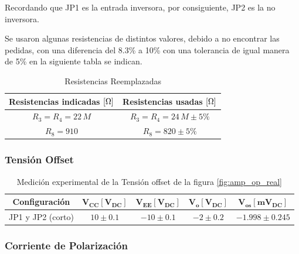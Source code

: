     Recordando que JP1 es la entrada inversora, por consiguiente, JP2 es la no inversora.

    Se usaron algunas resistencias de distintos valores, debido a no encontrar las pedidas, con una diferencia del 8.3\% a 10\% con una tolerancia de igual manera de 5\% en la siguiente tabla se indican.

    \begin{table}[H]
        \centering
        \begin{tabular}{|c|c|}
        \hline
           \textbf{Resistencias indicadas} $[\ohm]$  & \textbf{Resistencias usadas} $[\ohm]$\\\hline
            $R_3=R_4=22 \,M  $ & $R_3=R_4=24 \,M \pm 5\%$ \\\hline
            $R_8=910$ & $R_8=820 \pm 5\%$ \\\hline
        \end{tabular}
        \caption{Resistencias Reemplazadas}
        \label{tab:resistencias_reemplazadas}
    \end{table}
    
    \subsubsection{Tensión Offset}

        \begin{table}[H]
          \centering
          \begin{tabular}{|c|c|c|c|c|}
            \hline
            \textbf{Configuración} & $\mathbf{V_{CC} [V_{DC}]}$ & $\mathbf{V_{EE} [V_{DC}]}$ & $\mathbf{V_{o} [V_{DC}]}$ & $\mathbf{V_{os} [mV_{DC}]}$ \\
            \hline
            JP1 y JP2 (corto) & $10 \pm 0.1$ & $-10 \pm 0.1$ & $-2 \pm 0.2$ & $-1.998 \pm 0.245$ \\
            \hline
          \end{tabular}
          \caption{Medición experimental de la Tensión offset de la figura \ref{fig:amp_op_real}}
          \label{tab:tension_offset}
        \end{table}

    \subsubsection{Corriente de Polarización}

